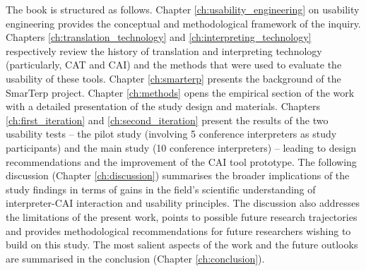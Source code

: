 The book is structured as follows. Chapter \ref{ch:usability_engineering} on usability engineering provides the conceptual and methodological framework of the inquiry. Chapters \ref{ch:translation_technology} and \ref{ch:interpreting_technology} respectively review the history of translation and interpreting technology (particularly, CAT and CAI) and the methods that were used to evaluate the usability of these tools. Chapter \ref{ch:smarterp} presents the background of the SmarTerp project. Chapter \ref{ch:methods} opens the empirical section of the work with a detailed presentation of the study design and materials. Chapters \ref{ch:first_iteration} and \ref{ch:second_iteration} present the results of the two usability tests -- the pilot study (involving 5 conference interpreters as study participants) and the main study (10 conference interpreters) -- leading to design recommendations and the improvement of the CAI tool prototype. The following discussion (Chapter \ref{ch:discussion}) summarises the broader implications of the study findings in terms of gains in the field’s scientific understanding of interpreter-CAI interaction and usability principles. The discussion also addresses the limitations of the present work, points to possible future research trajectories and provides methodological recommendations for future researchers wishing to build on this study. The most salient aspects of the work and the future outlooks are summarised in the conclusion (Chapter \ref{ch:conclusion}).
